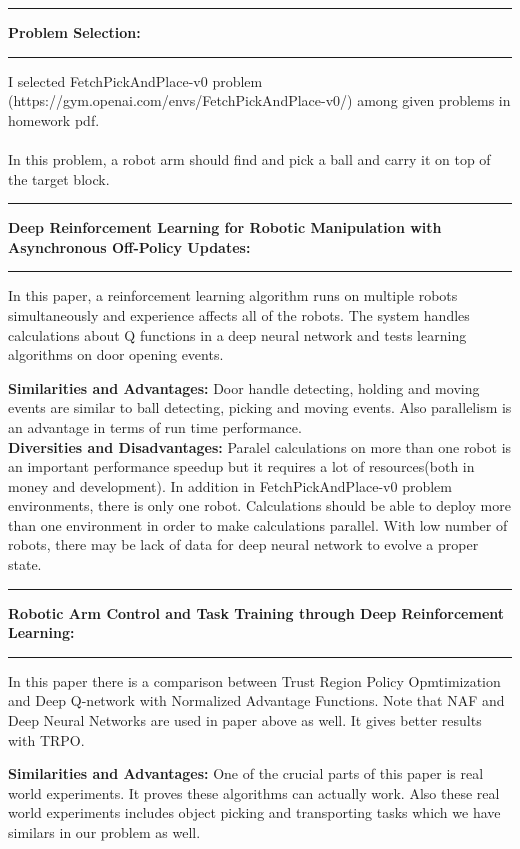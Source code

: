 \documentclass[11pt]{article}
\newcommand\question[2]{\vspace{.25in}\hrule\textbf{#1: #2}\vspace{.5em}\hrule\vspace{.10in}}
\renewcommand\part[1]{\vspace{.10in}\textbf{#1}}
\begin{document}
\raggedright
	\newcommand\NAME{Muhammed Burak Bugrul}
	\newcommand\ANDREWID{150140015}
	\newcommand\HWNUM{3}
	\question{Problem Selection}{}
	I selected FetchPickAndPlace-v0 problem (https://gym.openai.com/envs/FetchPickAndPlace-v0/) among given problems in homework pdf.\\ \ \\
	
	In this problem, a robot arm should find and pick a ball and carry it on top of the target block.
	
	\question{Deep Reinforcement Learning for Robotic Manipulation with Asynchronous Off-Policy Updates}{}
	In this paper, a reinforcement learning algorithm runs on multiple robots simultaneously and experience affects all of the robots. The system handles calculations about Q functions in a deep neural network and tests learning algorithms on door opening events.
	
	\part{Similarities and Advantages:} Door handle detecting, holding and moving events are similar to ball detecting, picking and moving events. Also parallelism is an advantage in terms of run time performance.\\
	\part{Diversities and Disadvantages:} Paralel calculations on more than one robot is an important performance speedup but it requires a lot of resources(both in money and development). In addition in FetchPickAndPlace-v0 problem environments, there is only one robot. Calculations should be able to deploy more than one environment in order to make calculations parallel. With low number of robots, there may be lack of data for deep neural network to evolve a proper state.

	\question{Robotic Arm Control and Task Training through Deep Reinforcement Learning}{}
	In this paper there is a comparison between Trust Region Policy Opmtimization and Deep Q-network with Normalized Advantage Functions. Note that NAF and Deep Neural Networks are used in paper above as well. It gives better results with TRPO.
	
	\part{Similarities and Advantages:} One of the crucial parts of this paper is real world experiments. It proves these algorithms can actually work. Also these real world experiments includes object picking and transporting tasks which we have similars in our problem as well.\\
\end{document}
